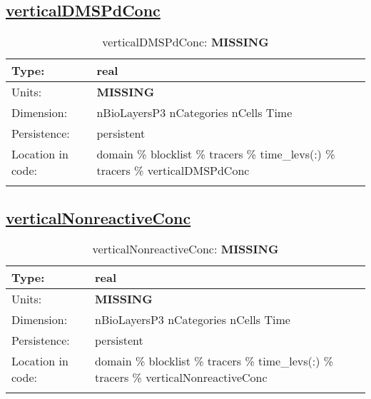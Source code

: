\subsection[verticalDMSPdConc]{\hyperref[sec:var_tab_tracers]{verticalDMSPdConc}}
\label{subsec:var_sec_tracers_verticalDMSPdConc}
\begin{center}
\begin{longtable}{| p{2.0in} | p{4.0in} |}
        \hline 
        Type: & real \\
        \hline 
        Units: & {\bf \color{red} MISSING} \\
        \hline 
        Dimension: & nBioLayersP3 nCategories nCells Time \\
        \hline 
        Persistence: & persistent \\
        \hline 
         Location in code: & domain \% blocklist \% tracers \% time\_levs(:) \% tracers \% verticalDMSPdConc \\
         \hline 
    \caption{verticalDMSPdConc: {\bf \color{red} MISSING}}
\end{longtable}
\end{center}
\subsection[verticalNonreactiveConc]{\hyperref[sec:var_tab_tracers]{verticalNonreactiveConc}}
\label{subsec:var_sec_tracers_verticalNonreactiveConc}
\begin{center}
\begin{longtable}{| p{2.0in} | p{4.0in} |}
        \hline 
        Type: & real \\
        \hline 
        Units: & {\bf \color{red} MISSING} \\
        \hline 
        Dimension: & nBioLayersP3 nCategories nCells Time \\
        \hline 
        Persistence: & persistent \\
        \hline 
         Location in code: & domain \% blocklist \% tracers \% time\_levs(:) \% tracers \% verticalNonreactiveConc \\
         \hline 
    \caption{verticalNonreactiveConc: {\bf \color{red} MISSING}}
\end{longtable}
\end{center}
